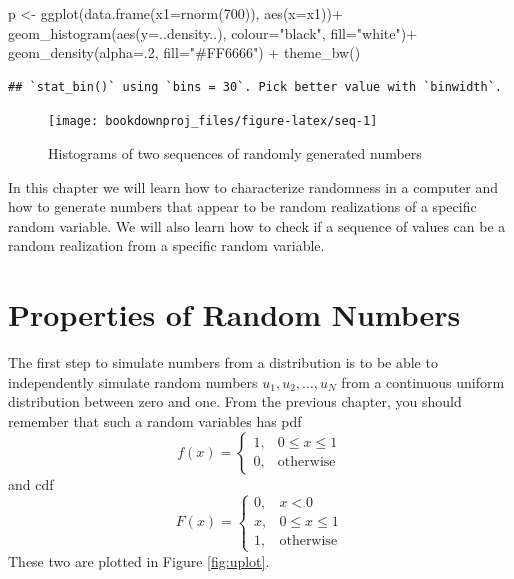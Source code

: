 \documentclass[
]{book}
\newenvironment{Shaded}{\begin{snugshade}}{\end{snugshade}}
\newcommand{\AttributeTok}[1]{\textcolor[rgb]{0.77,0.63,0.00}{#1}}
\newcommand{\DecValTok}[1]{\textcolor[rgb]{0.00,0.00,0.81}{#1}}
\newcommand{\FunctionTok}[1]{\textcolor[rgb]{0.00,0.00,0.00}{#1}}
\newcommand{\NormalTok}[1]{#1}
\newcommand{\OtherTok}[1]{\textcolor[rgb]{0.56,0.35,0.01}{#1}}
\newcommand{\SpecialCharTok}[1]{\textcolor[rgb]{0.00,0.00,0.00}{#1}}
\newcommand{\StringTok}[1]{\textcolor[rgb]{0.31,0.60,0.02}{#1}}
\begin{document}
\begin{Shaded}
\begin{Highlighting}[]
\NormalTok{p }\OtherTok{\textless{}{-}} \FunctionTok{ggplot}\NormalTok{(}\FunctionTok{data.frame}\NormalTok{(}\AttributeTok{x1=}\FunctionTok{rnorm}\NormalTok{(}\DecValTok{700}\NormalTok{)), }\FunctionTok{aes}\NormalTok{(}\AttributeTok{x=}\NormalTok{x1))}\SpecialCharTok{+}
   \FunctionTok{geom\_histogram}\NormalTok{(}\FunctionTok{aes}\NormalTok{(}\AttributeTok{y=}\NormalTok{..density..), }\AttributeTok{colour=}\StringTok{"black"}\NormalTok{, }\AttributeTok{fill=}\StringTok{"white"}\NormalTok{)}\SpecialCharTok{+}
 \FunctionTok{geom\_density}\NormalTok{(}\AttributeTok{alpha=}\NormalTok{.}\DecValTok{2}\NormalTok{, }\AttributeTok{fill=}\StringTok{"\#FF6666"}\NormalTok{)  }\SpecialCharTok{+} \FunctionTok{theme\_bw}\NormalTok{() }
\end{Highlighting}
\end{Shaded}

\begin{verbatim}
## `stat_bin()` using `bins = 30`. Pick better value with `binwidth`.
\end{verbatim}

\begin{figure}

{\centering \texttt{[image: bookdownproj\_files/figure-latex/seq-1]} 

}

\caption{Histograms of two sequences of randomly generated numbers}\label{fig:seq}
\end{figure}

In this chapter we will learn how to characterize randomness in a computer and how to generate numbers that appear to be random realizations of a specific random variable. We will also learn how to check if a sequence of values can be a random realization from a specific random variable.

\hypertarget{properties-of-random-numbers}{%
\section{Properties of Random Numbers}\label{properties-of-random-numbers}}

The first step to simulate numbers from a distribution is to be able to independently simulate random numbers \(u_1,u_2,\dots,u_N\) from a continuous uniform distribution between zero and one. From the previous chapter, you should remember that such a random variables has pdf
\[
f(x)=\left\{
\begin{array}{ll}
1, & 0\leq x \leq 1\\
0, &\mbox{otherwise}
\end{array}
\right.
\]
and cdf
\[
F(x)=\left\{
\begin{array}{ll}
0, & x<0\\
x, & 0\leq x \leq 1\\
1, &\mbox{otherwise}
\end{array}
\right.
\]
These two are plotted in Figure \ref{fig:uplot}.
\end{document}
